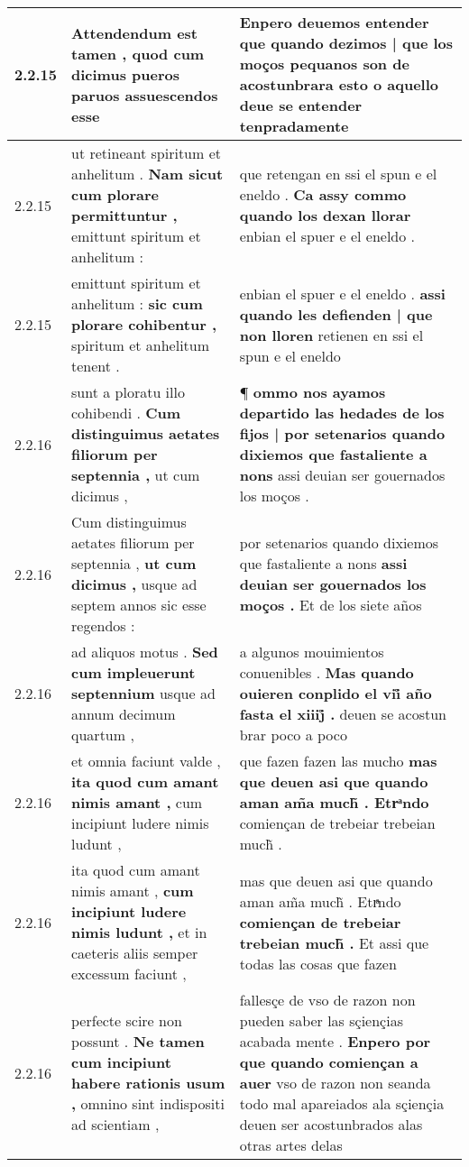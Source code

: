 \begin{tabular}{|p{1cm}|p{6.5cm}|p{6.5cm}|}
2.2.15 & Attendendum est tamen , \textbf{ quod cum dicimus pueros paruos } assuescendos esse & Enpero deuemos entender \textbf{ que quando dezimos | que los moços pequanos son de acostunbrara esto } o aquello deue se entender tenpradamente \\\hline
2.2.15 & ut retineant spiritum et anhelitum . \textbf{ Nam sicut cum plorare permittuntur , } emittunt spiritum et anhelitum : & que retengan en ssi el spun e el eneldo . \textbf{ Ca assy commo quando los dexan llorar } enbian el spuer e el eneldo . \\\hline
2.2.15 & emittunt spiritum et anhelitum : \textbf{ sic cum plorare cohibentur , } spiritum et anhelitum tenent . & enbian el spuer e el eneldo . \textbf{ assi quando les defienden | que non lloren } retienen en ssi el spun e el eneldo \\\hline
2.2.16 & sunt a ploratu illo cohibendi . \textbf{ Cum distinguimus aetates filiorum per septennia , } ut cum dicimus , & ¶ \textbf{ ommo nos ayamos departido las hedades de los fijos | por setenarios quando dixiemos que fastaliente a nons } assi deuian ser gouernados los moços . \\\hline
2.2.16 & Cum distinguimus aetates filiorum per septennia , \textbf{ ut cum dicimus , } usque ad septem annos sic esse regendos : & por setenarios quando dixiemos que fastaliente a nons \textbf{ assi deuian ser gouernados los moços . } Et de los siete años \\\hline
2.2.16 & ad aliquos motus . \textbf{ Sed cum impleuerunt septennium } usque ad annum decimum quartum , & a algunos mouimientos conuenibles . \textbf{ Mas quando ouieren conplido el vii̊ año fasta el xiiij̊ . } deuen se acostun brar poco a poco \\\hline
2.2.16 & et omnia faciunt valde , \textbf{ ita quod cum amant nimis amant , } cum incipiunt ludere nimis ludunt , & que fazen fazen las mucho \textbf{ mas que deuen asi que quando aman am̃a much̃ . Etrͣndo } comiençan de trebeiar trebeian much̃ . \\\hline
2.2.16 & ita quod cum amant nimis amant , \textbf{ cum incipiunt ludere nimis ludunt , } et in caeteris aliis semper excessum faciunt , & mas que deuen asi que quando aman am̃a much̃ . Etrͣndo \textbf{ comiençan de trebeiar trebeian much̃ . } Et assi que todas las cosas que fazen \\\hline
2.2.16 & perfecte scire non possunt . \textbf{ Ne tamen cum incipiunt habere rationis usum , } omnino sint indispositi ad scientiam , & fallesçe de vso de razon non pueden saber las sçiençias acabada mente . \textbf{ Enpero por que quando comiençan a auer } vso de razon non seanda todo mal apareiados ala sçiençia deuen ser acostunbrados alas otras artes delas \\\hline

\end{tabular}
